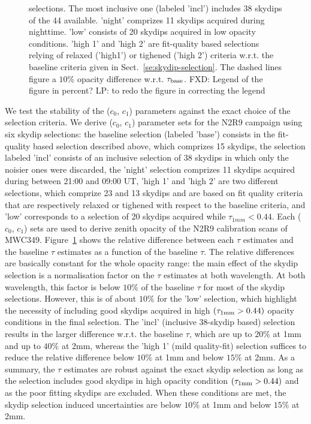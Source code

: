 \begin{figure}[ht!]
\begin{center}
{    selections. The most inclusive one (labeled 'incl')
    includes 38 skydips of the 44 available. 'night' comprizes 11
    skydips acquired during nighttime. 'low' consists of 20 skydips
    acquired in low opacity conditions. 'high
    1' and 'high 2' are fit-quality based selections relying of relaxed
    ('high1') or tighened ('high 2') criteria w.r.t. the baseline
    criteria given in Sect.~\ref{se:skydip-selection}. The dashed
    lines figure a $10\%$ opacity difference
    w.r.t. $\tau_{\rm{base}}$. {\color{blue} FXD: Legend of the figure in percent?} {\color{magenta} LP: to redo the figure in correcting the legend}
} 
\label{fig:skydip-selection-impact}
\end{center}
\end{figure}



We test the stability of the ($c_0$, $c_1$) parameters against the
exact choice of the selection criteria.
We derive ($c_0$, $c_1$) parameter sets for the N2R9 campaign using
six skydip selections: the baseline selection (labeled 'base')
consists in the fit-quality based selection described above, which
comprizes 15 skydips, the selection labeled 'incl' consists of an
inclusive selection of 38 skydips in which only the noisier ones were
discarded, the 'night' selection comprizes 11 skydips acquired during
between 21:00 and 09:00 UT,
'high 1' and 'high 2' are two different selections, which comprize 23
and 13 skydips and are based on fit quality criteria that are
respectively relaxed or tighened with respect to the baseline criteria, 
and 'low' corresponds to a selection of 20 skydips acquired while
$\tau_{1mm} < 0.44$. Each ($c_0$, $c_1$) sets are used to derive
zenith opacity of the N2R9 calibration scans of MWC349. 
Figure~\ref{fig:skydip-selection-impact} shows the relative
difference between each $\tau$ estimates and the baseline $\tau$
estimates as a function of the baseline $\tau$. The relative
differences are basically constant for the whole opacity range: the
main effect of the skydip selection is a normalisation factor on the
$\tau$ estimates at both wavelength. At both wavelength, this factor
is below $10\%$ of the baseline $\tau$ for most of the skydip
selections. However, this is of about $10\%$ for the 'low' selection,
which highlight the necessity of including good skydips acquired in
high $(\tau_{1\rm{mm}} > 0.44)$ opacity conditions in the final
selection. The 'incl' (inclusive 38-skydip based) selection results in the larger
difference w.r.t. the baseline $\tau$, which are up to $20\%$ at 1mm
and up to $40\%$ at $2$mm, whereas the 'high 1' (mild quality-fit)
selection suffices to reduce the relative difference below $10\%$ at
1mm and below $15\%$ at 2mm.
As a summary, the $\tau$ estimates are robust against the exact skydip
selection as long as the selection includes good
skydips in high opacity condition $(\tau_{1\rm{mm}} > 0.44)$ and as the poor
fitting skydips are excluded. When these conditions are met, the
skydip selection induced uncertainties are below $10\%$ at 1mm and
below $15\%$ at 2mm. 

